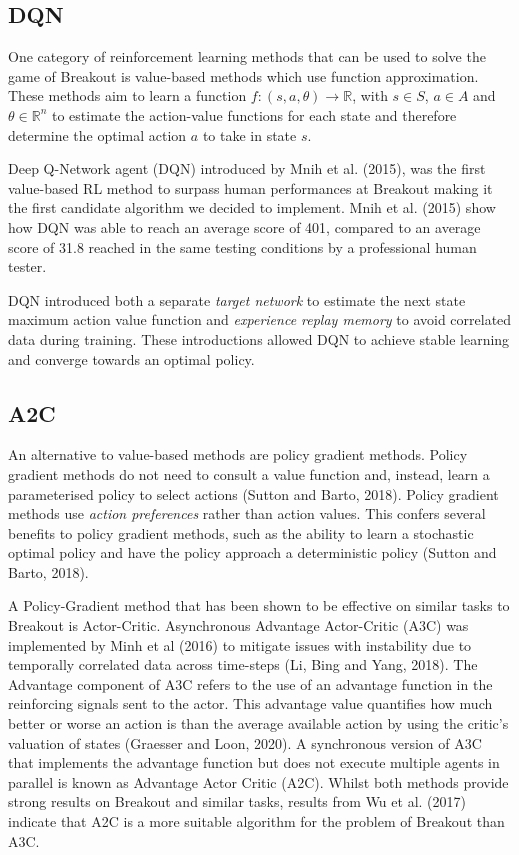 \documentclass{article}
\begin{document}
\subsection{DQN}
One category of reinforcement learning methods that can be used to solve the game of Breakout is value-based methods which use function approximation.
These methods aim to learn a function $f: (s,a,\theta) \rightarrow \mathbb{R}$, with $s \in S$,  $a \in A$ and $\theta \in \mathbb{R}^n$ to estimate the action-value functions for each state and therefore determine the optimal action $a$ to take in state $s$.

Deep Q-Network agent (DQN) introduced by Mnih et al. (2015), was the first value-based RL method to surpass human performances at Breakout making it the first candidate algorithm we decided to implement.
Mnih et al. (2015) show how DQN was able to reach an average score of 401, compared to an average score of 31.8 reached in the same testing conditions by a professional human tester.

DQN introduced both a separate \emph{target network} to estimate the next state maximum action value function and \emph{experience replay memory} to avoid correlated data during training. These introductions allowed DQN to achieve stable learning and converge towards an optimal policy.

\subsection{A2C}

An alternative to value-based methods are policy gradient methods. Policy gradient methods do not need to consult a value function and, instead, learn a parameterised policy to select actions (Sutton and Barto, 2018). Policy gradient methods use \emph{action preferences} rather than action values. This confers several benefits to policy gradient methods, such as the ability to learn a stochastic optimal policy and have the policy approach a deterministic policy (Sutton and Barto, 2018).

A Policy-Gradient method that has been shown to be effective on similar tasks to Breakout is Actor-Critic. Asynchronous Advantage Actor-Critic (A3C) was implemented by Minh et al (2016) to mitigate issues with instability due to temporally correlated data across time-steps (Li, Bing and Yang, 2018). The Advantage component of A3C refers to the use of an advantage function in the reinforcing signals sent to the actor. This advantage value quantifies how much better or worse an action is than the average available action by using the critic's valuation of states (Graesser and Loon, 2020). A synchronous version of A3C that implements the advantage function but does not execute multiple agents in parallel is known as Advantage Actor Critic (A2C). Whilst both methods provide strong results on Breakout and similar tasks, results from Wu et al. (2017) indicate that A2C is a more suitable algorithm for the problem of Breakout than A3C.
\end{document}
